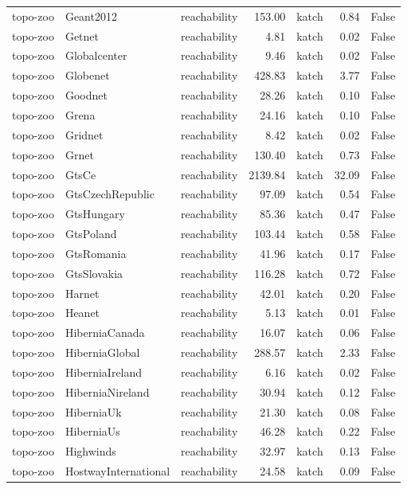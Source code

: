 \begin{tabular}{lllrlrr}
topo-zoo & Geant2012 & reachability & 153.00 & katch & 0.84 & False \\
topo-zoo & Getnet & reachability & 4.81 & katch & 0.02 & False \\
topo-zoo & Globalcenter & reachability & 9.46 & katch & 0.02 & False \\
topo-zoo & Globenet & reachability & 428.83 & katch & 3.77 & False \\
topo-zoo & Goodnet & reachability & 28.26 & katch & 0.10 & False \\
topo-zoo & Grena & reachability & 24.16 & katch & 0.10 & False \\
topo-zoo & Gridnet & reachability & 8.42 & katch & 0.02 & False \\
topo-zoo & Grnet & reachability & 130.40 & katch & 0.73 & False \\
topo-zoo & GtsCe & reachability & 2139.84 & katch & 32.09 & False \\
topo-zoo & GtsCzechRepublic & reachability & 97.09 & katch & 0.54 & False \\
topo-zoo & GtsHungary & reachability & 85.36 & katch & 0.47 & False \\
topo-zoo & GtsPoland & reachability & 103.44 & katch & 0.58 & False \\
topo-zoo & GtsRomania & reachability & 41.96 & katch & 0.17 & False \\
topo-zoo & GtsSlovakia & reachability & 116.28 & katch & 0.72 & False \\
topo-zoo & Harnet & reachability & 42.01 & katch & 0.20 & False \\
topo-zoo & Heanet & reachability & 5.13 & katch & 0.01 & False \\
topo-zoo & HiberniaCanada & reachability & 16.07 & katch & 0.06 & False \\
topo-zoo & HiberniaGlobal & reachability & 288.57 & katch & 2.33 & False \\
topo-zoo & HiberniaIreland & reachability & 6.16 & katch & 0.02 & False \\
topo-zoo & HiberniaNireland & reachability & 30.94 & katch & 0.12 & False \\
topo-zoo & HiberniaUk & reachability & 21.30 & katch & 0.08 & False \\
topo-zoo & HiberniaUs & reachability & 46.28 & katch & 0.22 & False \\
topo-zoo & Highwinds & reachability & 32.97 & katch & 0.13 & False \\
topo-zoo & HostwayInternational & reachability & 24.58 & katch & 0.09 & False \\

\end{tabular}
